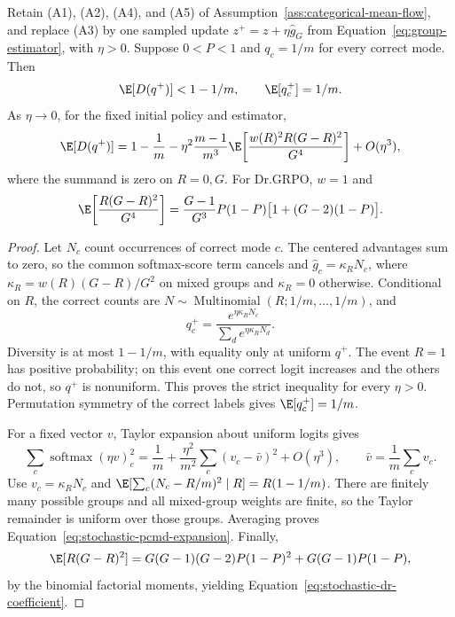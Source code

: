 \begin{proposition}
\enforcehalffinalproseline
\label{prop:stochastic-pcmd}
Retain (A1), (A2), (A4), and (A5) of
Assumption~\ref{ass:categorical-mean-flow}, and replace (A3) by one sampled
update $z^+=z+\eta\widehat g_G$ from
Equation~\eqref{eq:group-estimator}, with $\eta>0$. Suppose $0<P<1$ and $q_c=1/m$ for every correct mode. Then
\begin{equation}
 \E[D(q^+)]<1-1/m,
 \qquad \E[q_c^+]=1/m.
 \label{eq:stochastic-strict-decrease}
\end{equation}
As $\eta\to0$, for the fixed initial policy and estimator,
\begin{equation}
 \E[D(q^+)]
 =1-\frac1m
  -\eta^2\frac{m-1}{m^3}
    \E\!\left[\frac{w(R)^2R(G-R)^2}{G^4}\right]
  +O(\eta^3),
 \label{eq:stochastic-pcmd-expansion}
\end{equation}
where the summand is zero on $R=0,G$. For Dr.GRPO, $w=1$ and
\begin{equation}
 \E\!\left[\frac{R(G-R)^2}{G^4}\right]
 =\frac{G-1}{G^3}P(1-P)\big[1+(G-2)(1-P)\big].
 \label{eq:stochastic-dr-coefficient}
\end{equation}
\end{proposition}

\begin{proof}
\enforcehalffinalproseline
Let $N_c$ count occurrences of correct mode $c$. The centered advantages
sum to zero, so the common softmax-score term cancels and
$\widehat g_c=\kappa_RN_c$, where
$\kappa_R=w(R)(G-R)/G^2$ on mixed groups and $\kappa_R=0$ otherwise.
Conditional on $R$, the correct counts are
$N\sim\operatorname{Multinomial}(R;1/m,\ldots,1/m)$, and
\[
 q_c^+=\frac{e^{\eta\kappa_RN_c}}{\sum_de^{\eta\kappa_RN_d}}.
\]
Diversity is at most $1-1/m$, with equality only at uniform $q^+$.
The event $R=1$ has positive probability; on this event one correct logit
increases and the others do not, so $q^+$ is nonuniform. This proves the
strict inequality for every $\eta>0$. Permutation symmetry of the correct
labels gives $\E[q_c^+]=1/m$.

For a fixed vector $v$, Taylor expansion about uniform logits gives
\[
 \sum_c\operatorname{softmax}(\eta v)_c^2
 =\frac1m+\frac{\eta^2}{m^2}\sum_c(v_c-\bar v)^2+O(\eta^3),
 \qquad \bar v=\frac1m\sum_cv_c.
\]
Use $v_c=\kappa_RN_c$ and
$\E[\sum_c(N_c-R/m)^2\mid R]=R(1-1/m)$.
There are finitely many possible groups and all mixed-group weights are
finite, so the Taylor remainder is uniform over those groups. Averaging
proves Equation~\eqref{eq:stochastic-pcmd-expansion}.
Finally,
\[
 \E[R(G-R)^2]
 =G(G-1)(G-2)P(1-P)^2+G(G-1)P(1-P),
\]
by the binomial factorial moments, yielding
Equation~\eqref{eq:stochastic-dr-coefficient}.
\end{proof}

